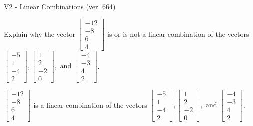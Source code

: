 \begin{exercise}
  \begin{exerciseTitle}V2 - Linear Combinations (ver. 664)\end{exerciseTitle}
  \begin{exerciseStatement}
    Explain why the vector \(\left[\begin{array}{c}
-12 \\
-8 \\
6 \\
4
\end{array}\right]\)  is or is not a linear 
	combination of the vectors \(\left[\begin{array}{c}
-5 \\
1 \\
-4 \\
2
\end{array}\right] , \left[\begin{array}{c}
1 \\
2 \\
-2 \\
0
\end{array}\right] , \text{ and } \left[\begin{array}{c}
-4 \\
-3 \\
4 \\
2
\end{array}\right]\).
	


  \end{exerciseStatement}
  \begin{exerciseAnswer}
   \(\left[\begin{array}{c}
-12 \\
-8 \\
6 \\
4
\end{array}\right]\) 
  	 is  
	a linear combination of the vectors \(\left[\begin{array}{c}
-5 \\
1 \\
-4 \\
2
\end{array}\right] , \left[\begin{array}{c}
1 \\
2 \\
-2 \\
0
\end{array}\right] , \text{ and } \left[\begin{array}{c}
-4 \\
-3 \\
4 \\
2
\end{array}\right]\).

	
  


  \end{exerciseAnswer}
\end{exercise}